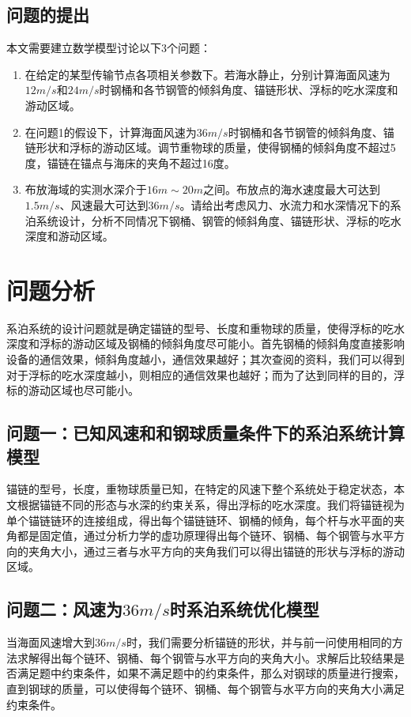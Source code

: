 \documentclass[withoutpreface,bwprint]{cumcmthesis} %
\begin{document}
\subsection{问题的提出}
\par 本文需要建立数学模型讨论以下3个问题：
\begin{enumerate}
  \item 在给定的某型传输节点各项相关参数下。若海水静止，分别计算海面风速为$12m/s$和$24m/s$时钢桶和各节钢管的倾斜角度、锚链形状、浮标的吃水深度和游动区域。
  \item 在问题1的假设下，计算海面风速为$36m/s$时钢桶和各节钢管的倾斜角度、锚链形状和浮标的游动区域。调节重物球的质量，使得钢桶的倾斜角度不超过5度，锚链在锚点与海床的夹角不超过16度。
  \item 布放海域的实测水深介于$16m\sim 20m$之间。布放点的海水速度最大可达到$1.5m/s$、风速最大可达到$36m/s$。请给出考虑风力、水流力和水深情况下的系泊系统设计，分析不同情况下钢桶、钢管的倾斜角度、锚链形状、浮标的吃水深度和游动区域。
\end{enumerate}

\section{问题分析}
\par 系泊系统的设计问题就是确定锚链的型号、长度和重物球的质量，使得浮标的吃水深度和浮标的游动区域及钢桶的倾斜角度尽可能小。首先钢桶的倾斜角度直接影响设备的通信效果，倾斜角度越小，通信效果越好；其次查阅的资料，我们可以得到对于浮标的吃水深度越小，则相应的通信效果也越好；而为了达到同样的目的，浮标的游动区域也尽可能小。
\subsection{问题一：已知风速和和钢球质量条件下的系泊系统计算模型}
锚链的型号，长度，重物球质量已知，在特定的风速下整个系统处于稳定状态，本文根据锚链不同的形态与水深的约束关系，得出浮标的吃水深度。我们将锚链视为单个锚链链环的连接组成，得出每个锚链链环、钢桶的倾角，每个杆与水平面的夹角都是固定值，通过分析力学的虚功原理得出每个链环、钢桶、每个钢管与水平方向的夹角大小，通过三者与水平方向的夹角我们可以得出锚链的形状与浮标的游动区域。
\subsection{问题二：风速为$36m/s$时系泊系统优化模型}
当海面风速增大到$36m/s$时，我们需要分析锚链的形状，并与前一问使用相同的方法求解得出每个链环、钢桶、每个钢管与水平方向的夹角大小。求解后比较结果是否满足题中约束条件，如果不满足题中的约束条件，那么对钢球的质量进行搜索，直到钢球的质量，可以使得每个链环、钢桶、每个钢管与水平方向的夹角大小满足约束条件。
\end{document}
